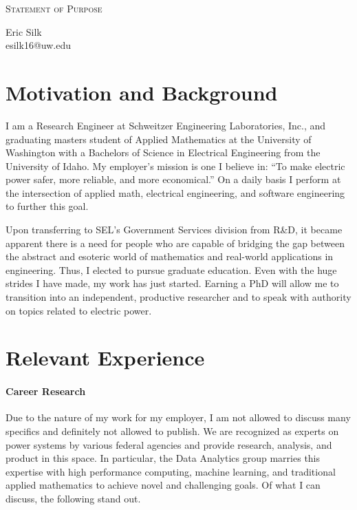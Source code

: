 \documentclass[letterpaper]{article}
\makeatletter
\newcommand{\soptitle}{Statement of Purpose}
\newcommand{\yourname}{Eric Silk}
\newcommand{\youremail}{esilk16@uw.edu}
\makeatother
\begin{document}
\begin{center}{\huge \scshape \soptitle}\end{center}
\begin{center}\vspace{0.2em} {\Large \yourname\\}
  {\youremail}\end{center}
\frenchspacing



\section*{Motivation and Background}
I am a Research Engineer at Schweitzer Engineering Laboratories, Inc., and graduating masters
student of Applied Mathematics at the University of Washington with a Bachelors of Science
in Electrical Engineering from the University of Idaho. My employer's mission is
one I believe in: ``To make electric power safer, more reliable, and more economical.'' On a daily
basis I perform at the intersection of applied math, electrical engineering, and software
engineering to further this goal.

Upon transferring to SEL's Government Services division from R\&D, it became apparent
there is a need for people who are capable of bridging the gap between the abstract
and esoteric world of mathematics and real-world applications in engineering.
Thus, I elected to pursue graduate education.
Even with the huge strides I have made, my work has just started. Earning a PhD will allow me to
transition into an independent, productive researcher and to speak with authority on topics
related to electric power.

\section*{Relevant Experience}
\paragraph{Career Research}
Due to the nature of my work for my employer, I am not allowed to discuss many specifics
and definitely not allowed to publish. We are recognized as experts
on power systems by various federal agencies and provide research, analysis,
and product in this space. In particular, the Data Analytics group marries this expertise
with high performance computing, machine learning, and traditional applied mathematics to
achieve novel and challenging goals. Of what I can discuss, the following stand out.
\end{document}
